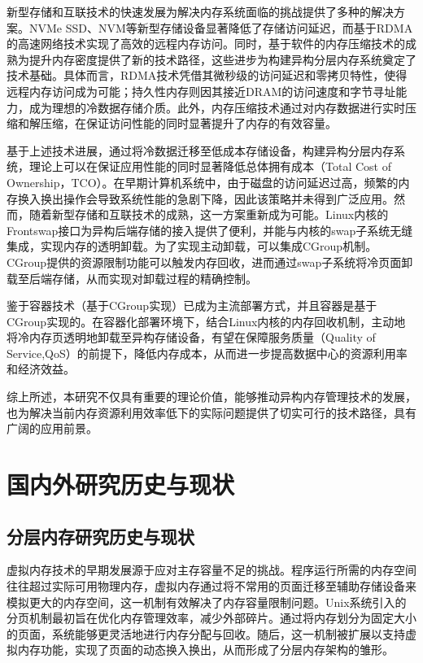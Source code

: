 新型存储和互联技术的快速发展为解决内存系统面临的挑战提供了多种的解决方案。NVMe SSD、NVM等新型存储设备显著降低了存储访问延迟，而基于RDMA的高速网络技术实现了高效的远程内存访问。同时，基于软件的内存压缩技术的成熟为提升内存密度提供了新的技术路径，这些进步为构建异构分层内存系统奠定了技术基础。具体而言，RDMA技术凭借其微秒级的访问延迟和零拷贝特性，使得远程内存访问成为可能；持久性内存则因其接近DRAM的访问速度和字节寻址能力，成为理想的冷数据存储介质。此外，内存压缩技术通过对内存数据进行实时压缩和解压缩，在保证访问性能的同时显著提升了内存的有效容量。

基于上述技术进展，通过将冷数据迁移至低成本存储设备，构建异构分层内存系统，理论上可以在保证应用性能的同时显著降低总体拥有成本（Total Cost of Ownership，TCO）。在早期计算机系统中，由于磁盘的访问延迟过高，频繁的内存换入换出操作会导致系统性能的急剧下降，因此该策略并未得到广泛应用。然而，随着新型存储和互联技术的成熟，这一方案重新成为可能。Linux内核的Frontswap接口为异构后端存储的接入提供了便利，并能与内核的swap子系统无缝集成，实现内存的透明卸载。为了实现主动卸载，可以集成CGroup机制。CGroup提供的资源限制功能可以触发内存回收，进而通过swap子系统将冷页面卸载至后端存储，从而实现对卸载过程的精确控制。

鉴于容器技术（基于CGroup实现）已成为主流部署方式，并且容器是基于 CGroup实现的。在容器化部署环境下，结合Linux内核的内存回收机制，主动地将冷内存页透明地卸载至异构存储设备，有望在保障服务质量（Quality of Service,QoS）的前提下，降低内存成本，从而进一步提高数据中心的资源利用率和经济效益。

综上所述，本研究不仅具有重要的理论价值，能够推动异构内存管理技术的发展，也为解决当前内存资源利用效率低下的实际问题提供了切实可行的技术路径，具有广阔的应用前景。

\section{国内外研究历史与现状}

\subsection{分层内存研究历史与现状}

虚拟内存技术的早期发展源于应对主存容量不足的挑战。程序运行所需的内存空间往往超过实际可用物理内存，虚拟内存通过将不常用的页面迁移至辅助存储设备来模拟更大的内存空间，这一机制有效解决了内存容量限制问题。Unix系统引入的分页机制最初旨在优化内存管理效率，减少外部碎片。通过将内存划分为固定大小的页面，系统能够更灵活地进行内存分配与回收。随后，这一机制被扩展以支持虚拟内存功能，实现了页面的动态换入换出，从而形成了分层内存架构的雏形。

